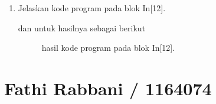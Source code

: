 \begin{enumerate}
\item Jelaskan kode program pada blok  In[12].

dan untuk hasilnya sebagai berikut
\begin{figure}[!htbp]
      \caption{hasil kode program pada blok  In[12].}
      \label{c152}
      \end{figure}

\end{enumerate}


\section{Fathi Rabbani / 1164074}
